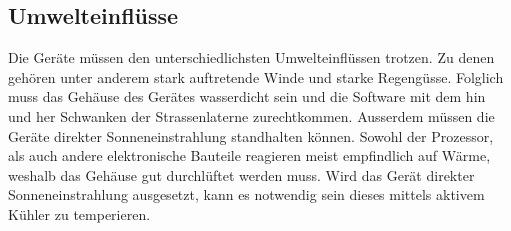 \subsection{Umwelteinflüsse}
Die Geräte müssen den unterschiedlichsten Umwelteinflüssen trotzen. Zu denen gehören unter anderem stark auftretende Winde und starke Regengüsse. Folglich muss das Gehäuse des Gerätes wasserdicht sein und die Software mit dem hin und her Schwanken der Strassenlaterne zurechtkommen. Ausserdem müssen die Geräte direkter Sonneneinstrahlung standhalten können. Sowohl der Prozessor, als auch andere elektronische Bauteile reagieren meist empfindlich auf Wärme, weshalb das Gehäuse gut durchlüftet werden muss. Wird das Gerät direkter Sonneneinstrahlung ausgesetzt, kann es notwendig sein dieses mittels aktivem Kühler zu temperieren.